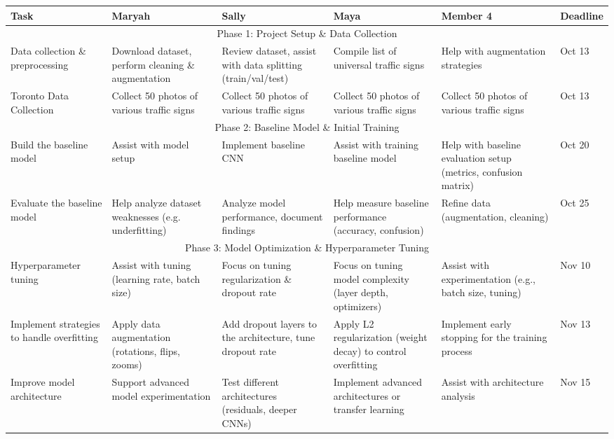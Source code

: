 \documentclass{article} %
\begin{document}
\begin{table} [h]
    \centering
    \begin{tabular}{|p{2.1cm}|p{2.5cm}|p{2.5cm}|p{2.5cm}|p{2.5cm}|p{1.3cm}|} \hline 
    
         Task&  Maryah&  Sally&  Maya&  Member 4& Deadline\\ \hline 
         \multicolumn{6}{|c|}{Phase 1: Project Setup \& Data Collection}\\ \hline 
         
         Data collection \& preprocessing&  Download dataset, perform cleaning \& augmentation&  Review dataset, assist with data splitting (train/val/test)&  Compile list of universal traffic signs&  Help with augmentation strategies& Oct 13\\ \hline 
         Toronto Data Collection&  Collect 50 photos of various traffic signs&  Collect 50 photos of various traffic signs&  Collect 50 photos of various traffic signs&  Collect 50 photos of various traffic signs& Oct 13\\ \hline 
         \multicolumn{6}{|c|}{Phase 2: Baseline Model \& Initial Training}\\ \hline 
         Build the baseline model&  Assist with model setup&  Implement baseline CNN&  Assist with training baseline model&  Help with baseline evaluation setup (metrics, confusion matrix)& Oct 20\\ \hline 
         Evaluate the baseline model&  Help analyze dataset weaknesses (e.g. underfitting)&  Analyze model performance, document findings&  Help measure baseline performance (accuracy, confusion)&  Refine data (augmentation, cleaning)& Oct 25\\ \hline 
         \multicolumn{6}{|c|}{Phase 3: Model Optimization \& Hyperparameter Tuning}\\ \hline 
         Hyperparameter tuning&  Assist with tuning (learning rate, batch size)&  Focus on tuning regularization \& dropout rate&  Focus on tuning model complexity (layer depth, optimizers)&  Assist with experimentation (e.g., batch size, tuning)& Nov 10\\ \hline 
 Implement strategies to handle overfitting& Apply data augmentation (rotations, flips, zooms)& Add dropout layers to the architecture, tune dropout rate& Apply L2 regularization (weight decay) to control overfitting& Implement early stopping for the training process&Nov 13\\ \hline 
 Improve model architecture& Support advanced model experimentation& Test different architectures (residuals, deeper CNNs)& Implement advanced architectures or transfer learning& Assist with architecture analysis&Nov 15\\ \hline 

\end{tabular}
\end{table}
\end{document}
